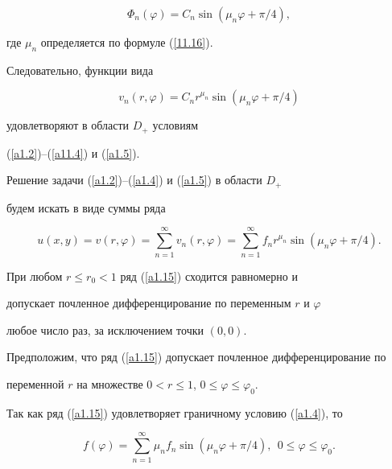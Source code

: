 $$


\Phi_n(\varphi)=C_n\sin\left(\mu_n\varphi+{\pi}/{4}\right),


$$


где $\mu_n$ определяется по формуле (\ref{11.16}).





Следовательно,  функции вида


$$


v_n(r,\varphi)=C_nr^{\mu_n}\sin\left(\mu_n\varphi+{\pi}/{4}\right)


$$


удовлетворяют в области $D_+$ условиям


(\ref{a1.2})--(\ref{a11.4}) и (\ref{a1.5}).





Решение задачи (\ref{a1.2})--(\ref{a1.4}) и (\ref{a1.5}) в области $D_+$ 


будем искать в виде суммы ряда


\begin{equation}


u(x,y)=v(r,\varphi)=\sum\limits^\infty_{n=1} v_n(r,\varphi)=


\sum\limits_{n=1}^\infty f_n r^{\mu_n}\sin\left(\mu_n\varphi+


{\pi}/{4}\right).\label{a1.15}


\end{equation}





При любом $r\leq r_0<1$ ряд (\ref{a1.15}) сходится равномерно и 


допускает почленное дифференцирование по переменным $r$ и $\varphi$ 


любое число раз, за исключением точки $(0,0)$.





Предположим, что ряд (\ref{a1.15}) допускает почленное дифференцирование по 


переменной $r$ на множестве $0<r\leq 1$, $0\leq\varphi\leq\varphi_0$. 


Так как ряд (\ref{a1.15}) удовлетворяет граничному условию (\ref{a1.4}), то


\begin{equation}


f(\varphi)=\sum\limits_{n=1}^\infty\mu_n f_n\sin\left(\mu_n\varphi+


{\pi}/{4}\right),\ \ 0\leq\varphi\leq\varphi_0.\label{a11.15}


\end{equation}


